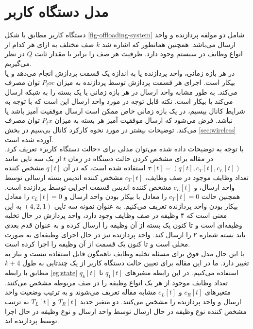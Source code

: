 \section{مدل دستگاه کاربر}
\label{sec:ue-model}
دستگاه کاربر مطابق با شکل \ref{fig-offloading-system} شامل دو مولفه پردازنده و واحد ارسال می‌باشد. همچنین همانطور که اشاره شد \(k\) صف مختلف به ازای هر کدام از انواع وظایف در سیستم وجود دارد. ظرفیت هر صف را برابر با مقدار ثابت \(Q\) در نظر می‌گیریم. \\

در هر بازه زمانی، واحد پردازنده یا به اندازه یک قسمت پردازش انجام می‌دهد و یا بیکار است. اجرای هر قسمت پردازش توسط پردازنده به میزان \(P_loc\) توان مصرف می‌کند. به طور مشابه واحد ارسال در هر بازه زمانی یا یک بسته را به شبکه ارسال می‌کند یا بیکار است. نکته قابل توجه در مورد واحد ارسال این است که با توجه به شرایط کانال بیسیم، در یک بازه زمانی خاص ممکن است ارسال موفقیت آمیز باشد یا نباشد. فرض می‌شود که ارسال موفقیت آمیز هر بسته به میزان \(P_tx\) توان مصرف می‌کند. توضیحات بیشتر در مورد نحوه کارکرد کانال بی‌سیم در بخش \ref{sec:wireless} آورده شده است. \\

با توجه به توضیحات داده شده می‌توان مدلی برای «حالت دستگاه کاربر» تعریف کرد. در مقاله \cite{Liu} برای مشخص کردن حالت دستگاه در زمان \(t\) از یک سه تایی مانند $\boldsymbol{\tau}[t]=\left(q[t], c_{T}[t], c_{L}[t]\right)$ استفاده شده است، که در آن \(q[t]\) مشخص کننده تعداد وظایف موجود در صف وظایف، \(c_T[t]\) مشخص کننده اندیس بسته ارسالی توسط واحد ارسال، و \(c_L[t]\) مشخص کننده اندیس قسمت اجرایی توسط پردازنده است. همچنین حالت \(c_T[t] = 0\) را معادل با بیکار بودن واحد ارسال و \(c_L[t] = 0\) را معادل بیکار بودن واحد پردازنده تعریف می‌کنیم. به عنوان نمونه سه تایی \((4, 2, 1)\) به این معنی است که ۴ وظیفه در صف وظایف وجود دارد، واحد پردازش در حال تخلیه وظیفه‌ای است و تا کنون یک بسته از آن وظیفه را ارسال کرده و به عنوان قدم بعدی باید بسته شماره ۲ را ارسال کند. واحد پردازنده نیز در حال اجرای وظیفه‌ای به صورت محلی است و تا کنون یک قسمت از آن وظیفه را اجرا کرده است. \\
\newpage
با این حال مدل فوق برای مسئله تخلیه وظایف ناهمگون قابل استفاده نیست و نیاز به تغییر دارد. ما در این مقاله برای تعیین حالت دستگاه کاربر از یک چندتایی به طول \(k + 4\) مطابق با رابطه \ref{eg:state} استفاده می‌کنیم. در این رابطه متغیرهای \(q_1[t]\) تا \(q_k[t]\) تعداد وظایف موجود از هر یک انواع وظیفه را در صف مربوطه مشخص می‌کنند. متغیرهای \(c_R[t]\) و \(c_L[t]\) مشابه مقاله \cite{Liu} تعریف می‌شوند و به ترتیب وضعیت واحد ارسال و واحد پردازنده را مشخص می‌کنند. دو متغیر جدید \(T_R[t]\) و \(T_L[t]\) به ترتیب مشخص کننده نوع وظیفه در حال ارسال توسط واحد ارسال و نوع وظیفه در حال اجرا توسط پردازنده اند.

